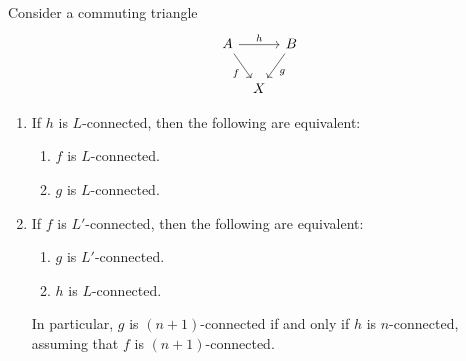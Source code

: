 \begin{prp}\label{thm:rsu-compose-cancel} %
Consider a commuting triangle
\begin{equation*}
\begin{tikzcd}[column sep=tiny]
A \arrow[rr,"h"] \arrow[dr,swap,"f"] & & B \arrow[dl,"g"] \\
& X
\end{tikzcd}
\end{equation*}
\begin{enumerate}
\item If $h$ is $L$-connected, then the following are equivalent:
\begin{enumerate}
\item $f$ is $L$-connected.
\item $g$ is $L$-connected.
\end{enumerate}
\item If $f$ is $L'$-connected, then the following are equivalent:
\begin{enumerate}
\item $g$ is $L'$-connected.
\item $h$ is $L$-connected.
\end{enumerate}
In particular, $g$ is $(n+1)$-connected if and only if $h$ is $n$-connected, assuming that $f$ is $(n+1)$-connected.
\end{enumerate}
\end{prp}

